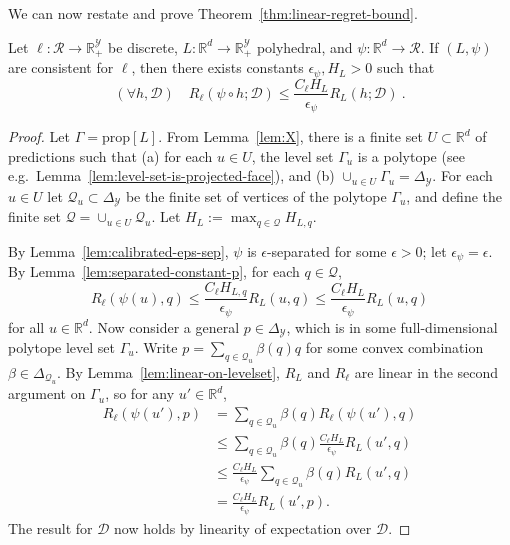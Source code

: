 \documentclass[twoside,11pt]{article}
\newcommand{\Comments}{1}
\newcommand{\mynote}[2]{\ifnum\Comments=1\textcolor{#1}{#2}\fi}
\newcommand{\raf}[1]{\mynote{darkgreen}{[RF: #1]}}
\newcommand{\reals}{\mathbb{R}}
\newcommand{\prop}[1]{\mathrm{prop}[#1]}
\newcommand{\simplex}{\Delta_\Y}
\newcommand{\D}{\mathcal{D}}
\newcommand{\R}{\mathcal{R}}
\newcommand{\Y}{\mathcal{Y}}
\begin{document}
We can now restate and prove Theorem~\ref{thm:linear-regret-bound}.
\begin{theorem}
  Let $\ell: \R \to \reals_+^{\Y}$ be discrete, $L: \reals^d \to \reals_+^{\Y}$ polyhedral, and $\psi: \reals^d \to \R$.
  If $(L,\psi)$ are consistent for $\ell$, then there exists constants $\epsilon_\psi, H_L > 0$ such that
    \[ (\forall h,\D) \quad R_{\ell}(\psi \circ h ; \D) \leq \frac{C_{\ell} H_L}{\epsilon_{\psi}} R_L(h ; \D) ~. \]
\end{theorem}
\begin{proof}
  Let $\Gamma = \prop{L}$.
  From Lemma~\ref{lem:X}, there is a finite set $U \subset \reals^d$ of predictions such that (a) for each $u \in U$, the level set $\Gamma_u$ is a polytope (see e.g.\ Lemma~\ref{lem:level-set-is-projected-face}), and (b) $\cup_{u \in U} \Gamma_u = \simplex$.
  For each $u\in U$ let $\mathcal{Q}_u \subset \simplex$ be the finite set of vertices of the polytope $\Gamma_u$, and define the finite set $\mathcal{Q} = \cup_{u \in U} \mathcal{Q}_u$.
  Let $H_L := \max_{q\in\mathcal{Q}} H_{L,q}$.
  
  By Lemma~\ref{lem:calibrated-eps-sep}, $\psi$ is $\epsilon$-separated for some $\epsilon>0$; let $\epsilon_{\psi} = \epsilon$.
  By Lemma~\ref{lem:separated-constant-p}, for each $q \in \mathcal{Q}$,
  \[ R_{\ell}(\psi(u),q) \leq \frac{C_{\ell} H_{L,q}}{\epsilon_{\psi}} R_L(u,q) \leq \frac{C_{\ell} H_L}{\epsilon_{\psi}} R_L(u,q)\]
  for all $u\in\reals^d$.
  Now consider a general $p \in \simplex$, which is in some full-dimensional polytope level set $\Gamma_u$.
  Write $p = \sum_{q \in \mathcal{Q}_u} \beta(q) q$ for some convex combination $\beta \in \Delta_{\mathcal Q_u}$.
  By Lemma~\ref{lem:linear-on-levelset}, $R_L$ and $R_{\ell}$ are linear in the second argument on $\Gamma_u$, so for any $u'\in\reals^d$,
  \begin{align*}
    R_{\ell}(\psi(u'),p)
    &=    \sum_{q \in \mathcal{Q}_u} \beta(q) R_{\ell}(\psi(u'), q)  \\
    &\leq \sum_{q \in \mathcal{Q}_u} \beta(q) \frac{C_{\ell} H_{L}}{\epsilon_{\psi}} R_L(u', q) \\
    &\leq \frac{C_{\ell} H_L}{\epsilon_{\psi}} \sum_{q \in \mathcal{Q}_u} \beta(q) R_L(u', q)  \\
    &= \frac{C_{\ell} H_L}{\epsilon_{\psi}} R_L(u', p) .
  \end{align*}
  The result for $\D$ now holds by linearity of expectation over $\D$.
\end{proof}
\end{document}
